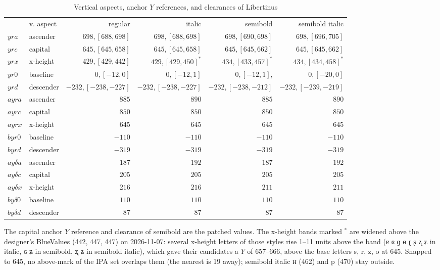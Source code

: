 \documentclass[landscape]{article}
\begin{document}
\begin{table}[htbp]
	\captionsetup{justification=raggedright, singlelinecheck=false}
	\caption{Vertical aspects, anchor $Y$ references, and clearances of Libertinus}
	\label{fig:vertical-aspects-of-Libertinus}
	\setlength{\tabcolsep}{2pt}

\begin{tabular}{l  l  r  r  r  r}
		& v. aspect	& regular				& italic				& semibold			& semibold italic\\
$yra$	& ascender	& $698,	[688,698]$		& $698, [688,698]$		& $698, [690,698]$	& $698, [696,705]$ \\
$yrc$	& capital	& $645,	[645,658]$		& $645, [645,658]$		& $645, [645,662]$	& $645, [645,662]$ \\
$yrx$	& x-height	& $429,	[429,442]$		& $429, [429,450]^*$		& $434, [433,457]^*$	& $434, [434,458]^*$ \\
$yr0$	& baseline	& $0,  [-12,0]$			& $0, [-12,1]$			& $0, [-12,1]$, 	& $0, [-20,0]$ \\
$yrd$	& descender	& $-232, [-238,-227]$	& $-232, [-238,-227]$	& $-232, [-238,-212]$& $-232, [-239,-219]$ \\
\hline
$ayra$	& ascender	& $885$	& $890$	& $885$	& $890$	\\
$ayrc$	& capital	& $850$	& $850$	& $850$	& $850$	\\
$ayrx$	& x-height	& $645$	& $645$	& $645$	& $645$	\\
$byr0$	& baseline	& $-110$& $-110$& $-110$& $-110$ \\
$byrd$	& descender	& $-319$& $-319$& $-319$& $-319$ \\
\hline
$ay\delta a$	& ascender	& $187$	& $192$	& $187$	& $192$	\\
$ay\delta c$	& capital	& $205$	& $205$	& $205$	& $205$	\\
$ay\delta x$	& x-height	& $216$	& $216$	& $211$	& $211$	\\
$by\delta 0$	& baseline	& $110$	& $110$	& $110$	& $110$	\\
$by\delta d$	& descender	& $87$	& $87$	& $87$	& $87$	\\
\end{tabular}

\end{table}

The capital anchor $Y$ reference and clearance of semibold are the patched values.
The x-height bands marked $^*$ are widened above the designer's BlueValues (442, 447, 447) on 2026-11-07:
several x-height letters of those styles rise 1--11 units above the band (ɐ ɞ ɡ ɵ ɽ ʂ ʐ ʑ in italic, ɢ ʑ in semibold, ʐ ʑ in semibold italic),
which gave their candidates a $Y$ of 657--666, above the base letters s, r, z, o at 645.
Snapped to 645, no above-mark of the IPA set overlaps them (the nearest is 19 away); semibold italic ʜ (462) and p (470) stay outside.
\end{document}
